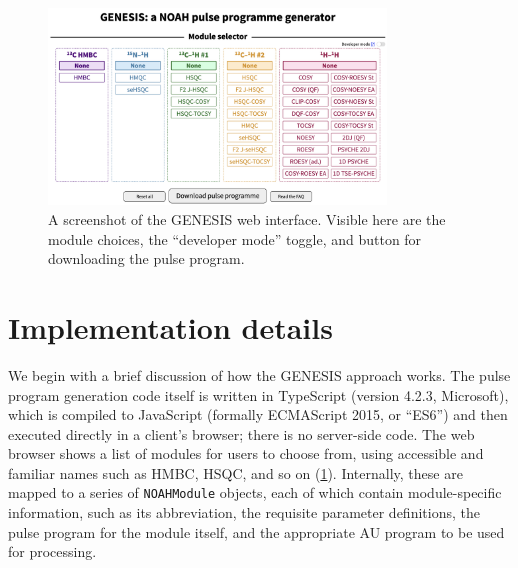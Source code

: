 \documentclass[a4paper,11pt]{article}
\begin{document}
\begin{refsection}
\begin{figure}
    \centering
    \includegraphics[width=0.8\textwidth]{screenshot.png}
    \caption{
        A screenshot of the GENESIS web interface.
        Visible here are the module choices, the ``developer mode'' toggle, and button for downloading the pulse program.
    }
    \label{fig:screenshot}
\end{figure}

\section{Implementation details}

We begin with a brief discussion of how the GENESIS approach works.
The pulse program generation code itself is written in TypeScript (version 4.2.3, Microsoft), which is compiled to JavaScript (formally ECMAScript 2015, or ``ES6'') and then executed directly in a client's browser; there is no server-side code.
The web browser shows a list of modules for users to choose from, using accessible and familiar names such as HMBC, HSQC, and so on (\cref{fig:screenshot}).
Internally, these are mapped to a series of \texttt{NOAHModule} objects, each of which contain module-specific information, such as its abbreviation, the requisite parameter definitions, the pulse program for the module itself, and the appropriate AU program to be used for processing. 


\end{refsection}
\end{document}
